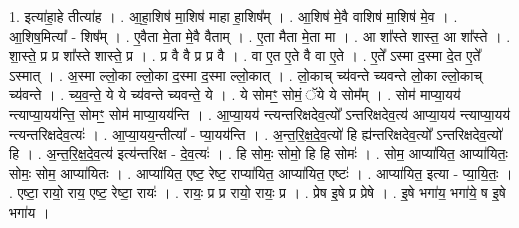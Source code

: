 \documentclass[17pt]{extarticle}
\begin{document}
1. इत्या॑हा॒हे तीत्या॑ह । . आ॒हा॒शिष॑ मा॒शिष॑ माहा हा॒शिष᳚म् । . आ॒शिष॑ मे॒वै वाशिष॑ मा॒शिष॑ मे॒व । . आ॒शिष॒मित्या᳚ - शिष᳚म् । . ए॒वैता मे॒ता मे॒वै वैताम् । . ए॒ता मैता मे॒ता मा । . आ शा᳚स्ते शास्त॒ आ शा᳚स्ते । . शा॒स्ते॒ प्र प्र शा᳚स्ते शास्ते॒ प्र । . प्र वै वै प्र प्र वै । . वा ए॒त ए॒ते वै वा ए॒ते । . ए॒ते᳚ ऽस्मा द॒स्मा दे॒त ए॒ते᳚ ऽस्मात् । . अ॒स्मा ल्लो॒का ल्लो॒का द॒स्मा द॒स्मा ल्लो॒कात् । . लो॒काच् च्य॑वन्ते च्यवन्ते लो॒का ल्लो॒काच् च्य॑वन्ते । . च्य॒व॒न्ते॒ ये ये च्य॑वन्ते च्यवन्ते॒ ये । . ये सोमꣳ॒॒ सोमं॒ ॅये ये सोम᳚म् । . सोम॑ माप्या॒यय॑ न्त्याप्या॒यय॑न्ति॒ सोमꣳ॒॒ सोम॑ माप्या॒यय॑न्ति । . आ॒प्या॒यय॑ न्त्यन्तरिक्षदेव॒त्यो᳚ ऽन्तरिक्षदेव॒त्य॑ आप्या॒यय॑ न्त्याप्या॒यय॑ न्त्यन्तरिक्षदेव॒त्यः॑ । . आ॒प्या॒यय॒न्तीत्या᳚ - प्या॒यय॑न्ति । . अ॒न्त॒रि॒क्ष॒दे॒व॒त्यो॑ हि ह्य॑न्तरिक्षदेव॒त्यो᳚ ऽन्तरिक्षदेव॒त्यो॑ हि । . अ॒न्त॒रि॒क्ष॒दे॒व॒त्य॑ इत्य॑न्तरिक्ष - दे॒व॒त्यः॑ । . हि सोमः॒ सोमो॒ हि हि सोमः॑ । . सोम॒ आप्या॑यित॒ आप्या॑यितः॒ सोमः॒ सोम॒ आप्या॑यितः । . आप्या॑यित॒ एष्ट॒ रेष्ट॒ राप्या॑यित॒ आप्या॑यित॒ एष्टः॑ । . आप्या॑यित॒ इत्या - प्या॒यि॒तः॒ । . एष्टा॒ रायो॒ राय॒ एष्ट॒ रेष्टा॒ रायः॑ । . रायः॒ प्र प्र रायो॒ रायः॒ प्र । . प्रेष इ॒षे प्र प्रेषे । . इ॒षे भगा॑य॒ भगा॑ये॒ ष इ॒षे भगा॑य । \newline
\end{document}

